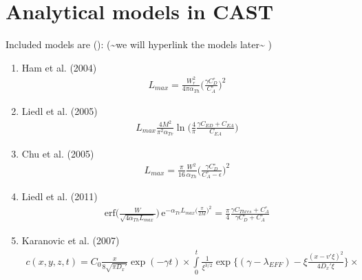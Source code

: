 \documentclass[letterpaper,10pt,english]{sphinxmanual}
\begin{document}
\section{Analytical models in CAST}
\label{\detokenize{contents/toolbox/an_model/an_model:analytical-models-in-cast}}
\sphinxAtStartPar
Included models are ():
(\textasciitilde{}we will hyperlink the models later\textasciitilde{} )
\begin{enumerate}
%
\item {} 
\sphinxAtStartPar
Ham et al. (2004)
\begin{equation*}
\begin{split}
  L_{max} = \frac{W_r^2}{4\pi\alpha_{Th}}\bigg(\frac{\gamma C_D^\circ}{C_A^\circ}\bigg)^2 
  \end{split}
\end{equation*}
\item {} 
\sphinxAtStartPar
Liedl et al. (2005)
\begin{equation*}
\begin{split}
 L_{max}\frac{4M^2}{\pi^2 \alpha_{Tv}}\ln\bigg( \frac{4}{\pi}  \frac{\gamma C_{ED}+ C_{EA}}{C_{EA}}\bigg)
\end{split}
\end{equation*}
\item {} 
\sphinxAtStartPar
Chu et al. (2005)
\begin{equation*}
\begin{split}
 L_{max} = \frac{\pi}{16}\frac{W^2}{\alpha_{Th}} \Bigg(\frac{\gamma C_D^\circ }{C_A^\circ -\epsilon}\Bigg)^2 
\end{split}
\end{equation*}
\item {} 
\sphinxAtStartPar
Liedl et al. (2011)
\begin{equation*}
\begin{split}
\text{erf}\Bigg(\frac{W}{\sqrt{4\alpha_{Th}L_{max}}}\Bigg)\,\text{e}^{-\alpha_{Tv}L_{max} \big(\frac{\pi}{2M}\big)^2} =\frac{\pi}{4}\frac{\gamma C_{Thres}+C_{A}^\circ}{\gamma C_{D}^\circ+C_{A}^\circ}
\end{split}
\end{equation*}
\item {} 
\sphinxAtStartPar
Karanovic et al. (2007) \sphinxhyphen{} 
\begin{equation*}
\begin{split}
c(x,y,z, t) = C_0 \frac{x}{8\sqrt{\pi D_x'}}\exp(-\gamma t) 
\times \int\limits_0^t\frac{1}{\xi^{3/2}}\exp\Bigg\{(\gamma-\lambda_{EFF})-\xi \frac{(x-v'\xi)^2}{4D_x'\xi}\Bigg\}
\times
\end{split}
\end{equation*}
\end{enumerate}
\end{document}
